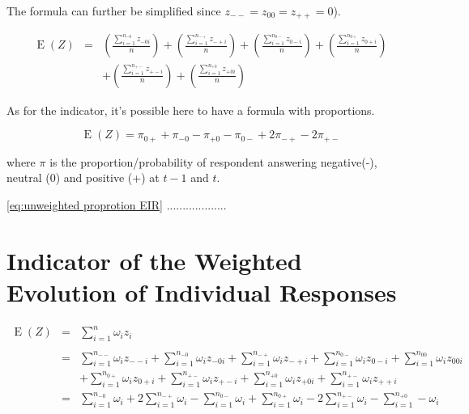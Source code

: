 \documentclass[12pt,a4paper,oneside]{book}
\DeclareMathOperator{\E}{E}
\begin{document}
The formula can further be simplified since $z_{--} = z_{00} = z_{++} = 0$).

\begin{eqnarray}
    \E(Z) &=&  
     \left( \frac{\sum_{i=1}^{n_{-0}} z_{-0i} }{n} \right)
    + \left( \frac{\sum_{i=1}^{n_{-+}} z_{-+i}}{n} \right)
    + \left( \frac{\sum_{i=1}^{n_{0-}} z_{0-i} }{n} \right)
    + \left( \frac{\sum_{i=1}^{n_{0+}} z_{0+i}}{n} \right) \nonumber \\
&&  + \left( \frac{\sum_{i=1}^{n_{+-}} z_{+-i} }{n} \right)
    + \left( \frac{\sum_{i=1}^{n_{+0}} z_{+0i} }{n} \right)
\end{eqnarray}




As for the indicator, it's possible here to have a formula with proportions.


\begin{equation}
    \E(Z) = \pi_{0+} + \pi_{-0} - \pi_{+0} - \pi_{0-} +2\pi_{-+} -2\pi_{+-} \label{eq:unweighted proprotion EIR}
\end{equation}

where $\pi$ is the proportion/probability of respondent answering negative(-), neutral (0) and positive (+) at $t-1$ and $t$. 

\autoref{eq:unweighted proprotion EIR} ...................

\section{Indicator of the Weighted Evolution of Individual Responses}

\begin{eqnarray}
    \E(Z) &=&  \sum_{i=1}^n \omega_i z_i \\ \nonumber \\
        &=& \sum_{i=1}^{n_{--}} \omega_i z_{--i} 
     + \sum_{i=1}^{n_{-0}} \omega_i z_{-0i}  
    + \sum_{i=1}^{n_{-+}} \omega_i z_{-+i} 
    + \sum_{i=1}^{n_{0-}} \omega_i z_{0-i}  
    + \sum_{i=1}^{n_{00}} \omega_i z_{00i}   \nonumber  \\
    &&  + \sum_{i=1}^{n_{0+}} \omega_i z_{0+i} 
    + \sum_{i=1}^{n_{+-}} \omega_i z_{+-i} 
    + \sum_{i=1}^{n_{+0}} \omega_i z_{+0i} 
    + \sum_{i=1}^{n_{+-}} \omega_i z_{++i} \\
&=&  \sum_{i=1}^{n_{-0}} \omega_i  
    + 2 \sum_{i=1}^{n_{-+}} \omega_i  
    - \sum_{i=1}^{n_{0-}} \omega_i         
    + \sum_{i=1}^{n_{0+}} \omega_i  
    - 2 \sum_{i=1}^{n_{+-}} \omega_i 
    - \sum_{i=1}^{n_{+0}} - \omega_i  
\end{eqnarray}
\end{document}
